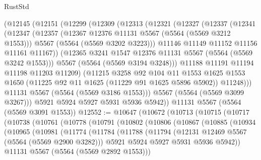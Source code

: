 \begin{lexlean}{RustStd}
\begin{coremodule}
    (@12145
      (@12151
        (@12299
          (@12309
            (@12313
              (@12321
                (@12327
                  (@12337
                    (@12341
                      (@12347
                        (@12357
                          (@12367 @12376 @11131 @5567 (@5564 (@5569 @3212 @1553)))
                          @5567
                          (@5564 (@5569 @3202 @3223)))
                        @11146
                        @11149
                        @11152
                        @11156
                        @11161
                        @11167))
                    (@12365 @3241 @1547 @12376 @11131 @5567 (@5564 (@5569 @3242 @1553)))
                    @5567
                    (@5564 (@5569 @3194 @3248)))
                  @11188
                  @11191
                  @11194
                  @11198
                  @11203
                  @11209)
                (@11215
                  @3258
                  @92
                  @104
                  @11
                  @1553
                  @1625
                  @1553
                  @1650
                  (@11225 @92 @11 @1625 (@11229 @91 @1625 @5896 @5902))
                  @11248)))
            @11131
            @5567
            (@5564 (@5569 @3186 @1553)))
          @5567
          (@5564 (@5569 @3099 @3267)))
        @5921
        @5924
        @5927
        @5931
        @5936
        @5942))
    @11131
    @5567
    (@5564 (@5569 @3091 @1553))
@12552 := @10647
    (@10672
      (@10713
        (@10715
          (@10717
            (@10738
              (@10761
                (@10778
                  (@10791
                    (@10802
                      (@10806
                        (@10867
                          (@10885
                            (@10934
                              (@10965
                                (@10981
                                  (@11774
                                    (@11784
                                      (@11788
                                        (@11794
                                          (@12131 @12469 @5567 (@5564 (@5569 @2900 @3282)))
                                          @5921
                                          @5924
                                          @5927
                                          @5931
                                          @5936
                                          @5942))
                                      @11131
                                      @5567
                                      (@5564 (@5569 @2892 @1553)))

\end{coremodule}
\end{lexlean}
